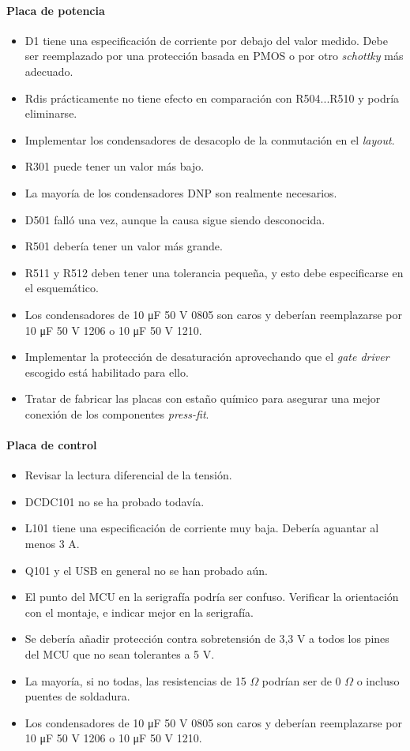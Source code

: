 \paragraph{Placa de potencia}
\begin{itemize}
	\item D1 tiene una especificación de corriente por debajo del valor medido. Debe ser reemplazado por una protección basada en PMOS o por otro \textit{schottky} más adecuado.
	\item Rdis prácticamente no tiene efecto en comparación con R504...R510 y podría eliminarse.
	\item Implementar los condensadores de desacoplo de la conmutación en el \textit{layout}.
	\item R301 puede tener un valor más bajo.
	\item La mayoría de los condensadores DNP son realmente necesarios.
	\item D501 falló una vez, aunque la causa sigue siendo desconocida.
	\item R501 debería tener un valor más grande.
	\item R511 y R512 deben tener una tolerancia pequeña, y esto debe especificarse en el esquemático.
	\item Los condensadores de 10 \unit{\micro\farad} 50 V 0805 son caros y deberían reemplazarse por 10 \unit{\micro\farad} 50 V 1206 o 10 \unit{\micro\farad} 50 V 1210.
	\item Implementar la protección de desaturación aprovechando que el \textit{gate driver} escogido está habilitado para ello.
	\item Tratar de fabricar las placas con estaño químico para asegurar una mejor conexión de los componentes \textit{press-fit}.	
\end{itemize}

\paragraph{Placa de control}
\begin{itemize}
	\item Revisar la lectura diferencial de la tensión.
	\item DCDC101 no se ha probado todavía.
	\item L101 tiene una especificación de corriente muy baja. Debería aguantar al menos 3 A.
	\item Q101 y el USB en general no se han probado aún.
	\item El punto del MCU en la serigrafía podría ser confuso. Verificar la orientación con el montaje, e indicar mejor en la serigrafía.
	\item Se debería añadir protección contra sobretensión de 3,3 V a todos los pines del MCU que no sean tolerantes a 5 V.
	\item La mayoría, si no todas, las resistencias de 15 $\Omega$ podrían ser de 0 $\Omega$ o incluso puentes de soldadura.
	\item Los condensadores de 10 \unit{\micro\farad} 50 V 0805 son caros y deberían reemplazarse por 10 \unit{\micro\farad} 50 V 1206 o 10 \unit{\micro\farad} 50 V 1210.
\end{itemize}

